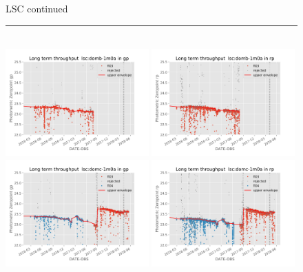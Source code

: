 \documentclass[]{spieman}
\begin{document}
\begin{figure}\ContinuedFloat
\centering 
LSC continued \\ 
\rule{\textwidth}{0.4pt} \\
\includegraphics[width=0.49\textwidth]{images/photzptrend-lsc-domb-1m0a-gp.png} \hspace*{\fill}
\includegraphics[width=0.49\textwidth]{images/photzptrend-lsc-domb-1m0a-rp.png} \\
\includegraphics[width=0.49\textwidth]{images/photzptrend-lsc-domc-1m0a-gp.png} \hspace*{\fill}
\includegraphics[width=0.49\textwidth]{images/photzptrend-lsc-domc-1m0a-rp.png} \\[1ex]

\end{figure}
\end{document}
